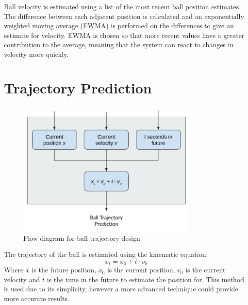Ball velocity is estimated using a list of the most recent ball position estimates. The difference between each adjacent position is calculated and an exponentially weighted moving average (EWMA) is performed on the differences to give an estimate for velocity. EWMA is chosen so that more recent values have a greater contribution to the average, meaning that the system can react to changes in velocity more quickly.

\section{Trajectory Prediction}

\begin{figure}[H]
    \centering
    \includegraphics[width=9cm]{images/trajectory-design.png}
    \caption{Flow diagram for ball trajectory design}
    \label{fig:trajectory design}
\end{figure}

The trajectory of the ball is estimated using the kinematic equation:
\[ x_t = x_0 + t \cdot v_0 \]
Where $x$ is the future position, $x_0$ is the current position, $v_0$ is the current velocity and $t$ is the time in the future to estimate the position for. This method is used due to its simplicity, however a more advanced technique could provide more accurate results. 
